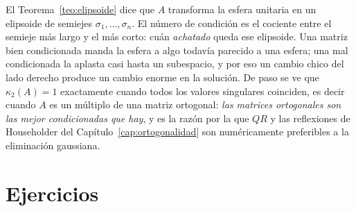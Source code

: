 \begin{remark}\label{obs:condicion-elipsoide}
El Teorema~\ref{teo:elipsoide} dice que $A$ transforma la esfera unitaria en
un elipsoide de semiejes $\sigma_1,\dots,\sigma_n$. El número de condición es
el cociente entre el semieje más largo y el más corto: cuán \emph{achatado}
queda ese elipsoide. Una matriz bien condicionada manda la esfera a algo
todavía parecido a una esfera; una mal condicionada la aplasta casi hasta un
subespacio, y por eso un cambio chico del lado derecho produce un cambio
enorme en la solución. De paso se ve que $\kappa_2(A)=1$ exactamente cuando
todos los valores singulares coinciden, es decir cuando $A$ es un múltiplo de
una matriz ortogonal: \emph{las matrices ortogonales son las mejor
condicionadas que hay}, y es la razón por la que $QR$ y las reflexiones de
Householder del Capítulo~\ref{cap:ortogonalidad} son numéricamente preferibles
a la eliminación gaussiana.
\end{remark}





\section*{Ejercicios}

